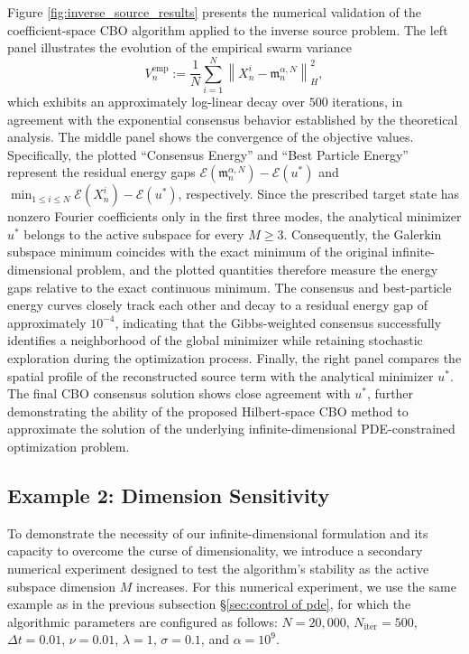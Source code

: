 \documentclass[12pt]{amsart}
\numberwithin{equation}{section}
\begin{document}
Figure \ref{fig:inverse_source_results} presents the numerical validation of the coefficient-space CBO algorithm applied to the inverse source problem. The left panel illustrates the evolution of the empirical swarm variance
\begin{equation*}
    V_n^{\mathrm{emp}} := \frac{1}{N}\sum_{i=1}^N \left\|X_n^i-\mathfrak{m}_n^{\alpha,N}\right\|_H^2,
\end{equation*}
which exhibits an approximately log-linear decay over $500$ iterations, in agreement with the exponential consensus behavior established by the theoretical analysis. The middle panel shows the convergence of the objective values. Specifically, the plotted ``Consensus Energy'' and ``Best Particle Energy'' represent the residual energy gaps $\mathscr{E}(\mathfrak{m}_n^{\alpha,N})-\mathscr{E}(u^*)$ and $\min_{1\leq i\leq N}\mathscr{E}(X_n^i)-\mathscr{E}(u^*)$, respectively. Since the prescribed target state has nonzero Fourier coefficients only in the first three modes, the analytical minimizer $u^*$ belongs to the active subspace for every $M\geq 3$. Consequently, the Galerkin subspace minimum coincides with the exact minimum of the original infinite-dimensional problem, and the plotted quantities therefore measure the energy gaps relative to the exact continuous minimum. The consensus and best-particle energy curves closely track each other and decay to a residual energy gap of approximately $10^{-4}$, indicating that the Gibbs-weighted consensus successfully identifies a neighborhood of the global minimizer while retaining stochastic exploration during the optimization process. Finally, the right panel compares the spatial profile of the reconstructed source term with the analytical minimizer $u^*$. The final CBO consensus solution shows close agreement with $u^*$, further demonstrating the ability of the proposed Hilbert-space CBO method to approximate the solution of the underlying infinite-dimensional PDE-constrained optimization problem.

\subsection{Example 2: Dimension Sensitivity}

To demonstrate the necessity of our infinite-dimensional formulation and its capacity to overcome the curse of dimensionality, we introduce a secondary numerical experiment designed to test the algorithm's stability as the active subspace dimension $M$ increases.  For this numerical experiment, we use the same example as in the previous subsection \S \ref{sec:control of pde}, for which the algorithmic parameters are configured as follows: $N = 20{,}000$, $N_{\text{iter}} = 500$, $\Delta t = 0.01$, $\nu = 0.01$, $\lambda = 1$, $\sigma = 0.1$, and $\alpha = 10^9$.
\end{document}
